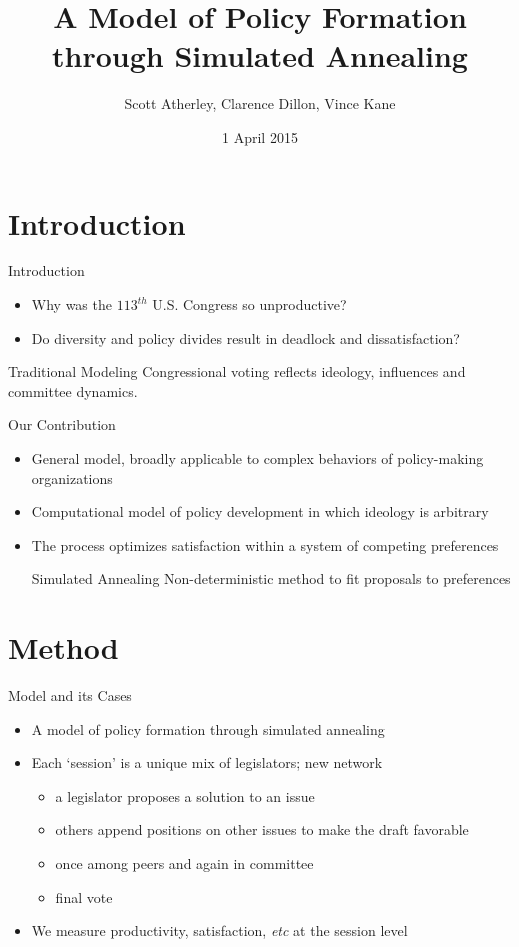 \documentclass[14pt]{beamer}
\author{Scott Atherley, Clarence Dillon, Vince Kane}
\title{A Model of Policy Formation through Simulated Annealing}
\institute{George Mason University}
\date{1 April 2015}
\begin{document}
\begin{frame}
\titlepage
\end{frame}

\section*{Introduction}
\begin{frame}{Introduction}
\begin{itemize}
\item Why was the $113^{th}$ U.S. Congress so unproductive?
\item Do diversity and policy divides result in deadlock and dissatisfaction?
\end{itemize}

\begin{block}{Traditional Modeling}
  Congressional voting reflects ideology, influences and committee dynamics.
   \end{block}
\end{frame}

\begin{frame}{Our Contribution}
\begin{itemize}
\item General model, broadly applicable to complex behaviors of policy-making organizations
\item Computational model of policy development in which ideology is arbitrary
\item The process optimizes satisfaction within a system of competing preferences

\begin{block}{Simulated Annealing}
  Non-deterministic method to fit proposals to preferences
   \end{block}
\end{itemize}
\end{frame}

\section*{Method} %
\begin{frame}{Model and its Cases}
\begin{itemize}
\item A model of policy formation through simulated annealing
\item Each `session' is a unique mix of legislators; new network
 \begin{itemize}
 \item a legislator proposes a solution to an issue
 \item others append positions on other issues to make the draft favorable
 \item once among peers and again in committee
 \item final vote 
 \end{itemize}  
\item We measure productivity, satisfaction, \textit{etc} at the session level
\end{itemize}
\end{frame}
\end{document}

